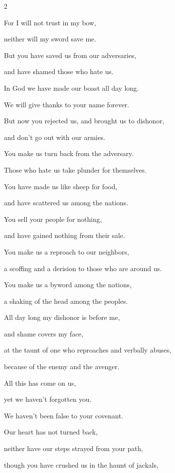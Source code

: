 \begin{multicols}{2}
	
	\myverse{}For I will not trust in my bow,
	
	neither will my sword save me.
	
	
	\myverse{}But you have saved us from our adversaries,
	
	and have shamed those who hate us.
	
	
	\myverse{}In God we have made our boast all day long.
	
	We will give thanks to your name forever.
	
	\vspace{\baselineskip}	
	
	
	\myverse{}But now you rejected us, and brought us to dishonor,
	
	and don’t go out with our armies.
	
	
	\myverse{}You make us turn back from the adversary.
	
	Those who hate us take plunder for themselves.
	
	
	\myverse{}You have made us like sheep for food,
	
	and have scattered us among the nations.
	
	
	\myverse{}You sell your people for nothing,
	
	and have gained nothing from their sale.
	
	
	\myverse{}You make us a reproach to our neighbors,
	
	a scoffing and a derision to those who are around us.
	
	
	\myverse{}You make us a byword among the nations,
	
	a shaking of the head among the peoples.
	
	
	\myverse{}All day long my dishonor is before me,
	
	and shame covers my face,
	
	
	\myverse{}at the taunt of one who reproaches and verbally abuses,
	
	because of the enemy and the avenger.
	
	
	\myverse{}All this has come on us,
	
	yet we haven’t forgotten you.
	
	We haven’t been false to your covenant.
	
	
	\myverse{}Our heart has not turned back,
	
	neither have our steps strayed from your path,
	
	
	\myverse{}though you have crushed us in the haunt of jackals,
	

\end{multicols}
